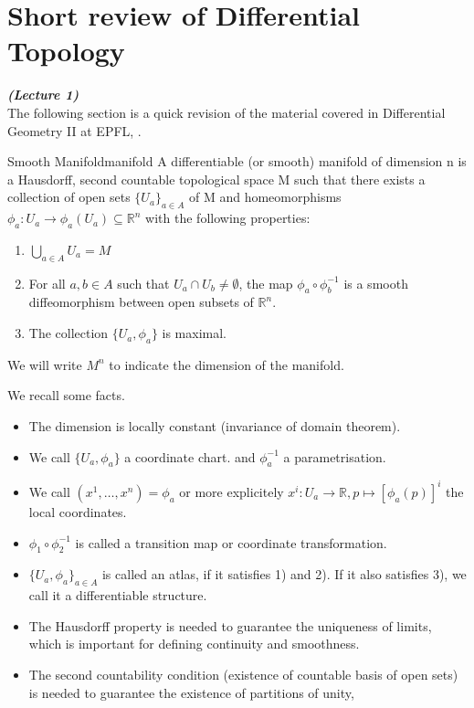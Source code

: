 


\section{Short review of Differential Topology}
\vspace{0.4cm}\emph{\textbf{(Lecture 1)}}\\


The following section is a quick revision of the material covered in Differential Geometry II at EPFL, 
\cite{tsakanikas2024dg2}.

\begin{colordef}{Smooth Manifold}{manifold}
A differentiable (or smooth) manifold of dimension n is a Hausdorff, second countable topological space M such that there exists a collection of open sets $\{U_a\}_{a \in A}$ of M and homeomorphisms $\phi_a: U_a \to \phi_a(U_a) \subseteq \mathbb{R}^n$ with the following properties:

\begin{enumerate}
    \item $\bigcup_{a \in A} U_a = M$
    \item For all $a, b \in A$ such that $U_a \cap U_b \neq \emptyset$, the map $\phi_a \circ \phi_b^{-1}$ is a smooth diffeomorphism between open subsets of $\mathbb{R}^n$.
    \item The collection $\{U_a, \phi_a\}$ is maximal.
\end{enumerate}
We will write $M^n$ to indicate the dimension of the manifold.
\end{colordef}

\begin{colremark}[]
We recall some facts.
\begin{itemize}[itemsep=0pt, topsep=0pt]
    \item The dimension is locally constant (invariance of domain theorem).
    \item We call $\{U_a, \phi_a\}$ a coordinate chart. and $\phi_a^{-1}$ a parametrisation.
    \item We call $(x^1, \dots, x^n) = \phi_a$ or more explicitely $x^i:U_a\to\mathbb{R},p\mapsto [\phi_a(p)]^i$ the local coordinates.
    \item $\phi_1\circ \phi_2^{-1}$ is called a transition map or coordinate transformation.
    \item $\{U_a, \phi_a\}_{a\in A}$ is called an atlas, if it satisfies 1) and 2). If it also satisfies 3), we call it a differentiable structure.
    \item The Hausdorff property is needed to guarantee the uniqueness of limits, which is important for defining continuity and smoothness.
    \item The second countability condition (existence of countable basis of open sets) is needed to guarantee the existence of partitions of unity,
\end{itemize}
\end{colremark}

